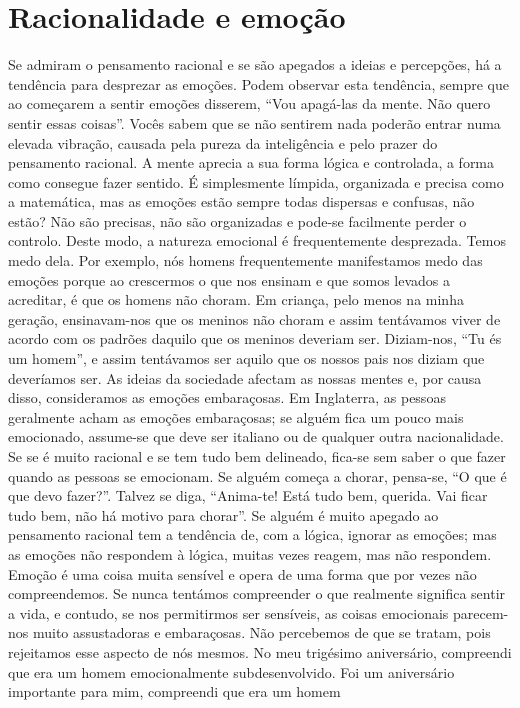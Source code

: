 \section{Racionalidade e emoção}

Se admiram o pensamento racional e se são apegados a
ideias e percepções, há a tendência para desprezar as
emoções. Podem observar esta tendência, sempre que ao
começarem a sentir emoções disserem, “Vou apagá-las da
mente. Não quero sentir essas coisas”. Vocês sabem que se
não sentirem nada poderão entrar numa elevada vibração,
causada pela pureza da inteligência e pelo prazer do pensamento racional. A mente aprecia a sua forma lógica e controlada,
a forma como consegue fazer sentido. É simplesmente límpida,
organizada e precisa como a matemática, mas as emoções
estão sempre todas dispersas e confusas, não estão? Não são
precisas, não são organizadas e pode-se facilmente perder o
controlo.
Deste modo, a natureza emocional é frequentemente
desprezada. Temos medo dela. Por exemplo, nós homens
frequentemente manifestamos medo das emoções porque ao
crescermos o que nos ensinam e que somos levados a acreditar,
é que os homens não choram. Em criança, pelo menos na
minha geração, ensinavam-nos que os meninos não choram e
assim tentávamos viver de acordo com os padrões daquilo
que os meninos deveriam ser. Diziam-nos, “Tu és um
homem”, e assim tentávamos ser aquilo que os nossos pais
nos diziam que deveríamos ser. As ideias da sociedade afectam
as nossas mentes e, por causa disso, consideramos as
emoções embaraçosas. Em Inglaterra, as pessoas geralmente
acham as emoções embaraçosas; se alguém fica um pouco
mais emocionado, assume-se que deve ser italiano ou de
qualquer outra nacionalidade.
Se se é muito racional e se tem tudo bem delineado, fica-se
sem saber o que fazer quando as pessoas se emocionam. Se
alguém começa a chorar, pensa-se, “O que é que devo
fazer?”. Talvez se diga, “Anima-te! Está tudo bem, querida.
Vai ficar tudo bem, não há motivo para chorar”. Se alguém é
muito apegado ao pensamento racional tem a tendência de,
com a lógica, ignorar as emoções; mas as emoções não
respondem à lógica, muitas vezes reagem, mas não respondem.
Emoção é uma coisa muita sensível e opera de uma forma que
por vezes não compreendemos. Se nunca tentámos compreender o que realmente significa sentir a vida, e contudo, se
nos permitirmos ser sensíveis, as coisas emocionais parecem-nos muito assustadoras e embaraçosas. Não percebemos de
que se tratam, pois rejeitamos esse aspecto de nós mesmos.
No meu trigésimo aniversário, compreendi que era um
homem emocionalmente subdesenvolvido. Foi um aniversário importante para mim, compreendi que era um homem
